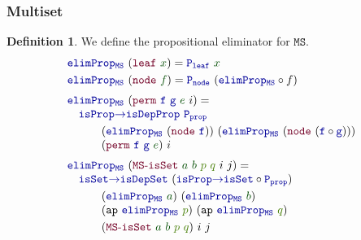 \documentclass[xelatex,mathserif,serif,notheorems]{beamer} %
\theoremstyle{plain} %
\theoremstyle{definition}
\newtheorem{defn}[thm]{Definition}%
\theoremstyle{remark}
\newcommand*{\term}[1]{\textcolor{green!30!black}{#1}} %
\newcommand*{\pathterm}[1]{\textcolor{green!65!red!75!black}{#1}}
\newcommand*{\function}[1]{\textcolor{blue!60!black}{\ensuremath{\mathtt{#1}}}}
\newcommand*{\constructor}[1]{\textcolor{purple!60!black}{\ensuremath{\mathtt{#1}}}}
\newcommand*{\typeformer}[1]{\ensuremath{\mathtt{#1}}}
\begin{document}
\begin{frame}
  \frametitle{Multiset}
  \begin{defn}
    We define the propositional eliminator for \(\typeformer{MS}\).
    \begin{equation}
      \begin{aligned}
        &\function{elimProp_{MS}}~(\constructor{leaf}~\term{x}) = \function{P_{leaf}}~\term{x} \\
        &\function{elimProp_{MS}}~(\constructor{node}~\term{f}) = \function{P_{node}}~(\function{elimProp_{MS}} \circ f) \\[1mm]
        &\function{elimProp_{MS}}~(\constructor{perm}~\function{f}~\function{g}~\term{e}~i) = \\[-1mm]
        &\quad\function{isProp{\rightarrow}isDepProp}~\function{P_{prop}}~\\
        &\quad\qquad(\function{elimProp_{MS}}~(\constructor{node}~\function{f}))~(\function{elimProp_{MS}}~(\constructor{node}~(\function{f} \circ \function{g})))\\[-1mm]
        &\quad\qquad(\constructor{perm}~\function{f}~\function{g}~\term{e})~i \\[1mm]
        &\function{elimProp_{MS}}~(\constructor{MS\text{-}isSet}~\term{a}~\term{b}~\pathterm{p}~\pathterm{q}~i~j) = \\[-1mm]
        &\quad\function{isSet{\rightarrow}isDepSet}~(\function{isProp{\rightarrow}isSet} \circ \function{P_{prop}})~\\
        &\quad\qquad(\function{elimProp_{MS}}~\term{a})~(\function{elimProp_{MS}}~\term{b})\\[-1mm]
        &\quad\qquad(\mathtt{ap}~\function{elimProp_{MS}}~\pathterm{p})~(\mathtt{ap}~\function{elimProp_{MS}}~\pathterm{q})\\
        &\quad\qquad(\constructor{MS\text{-}isSet}~\term{a}~\term{b}~\pathterm{p}~\pathterm{q})~i~j \\
      \end{aligned}
    \end{equation}
  \end{defn}
\end{frame}
\end{document}
